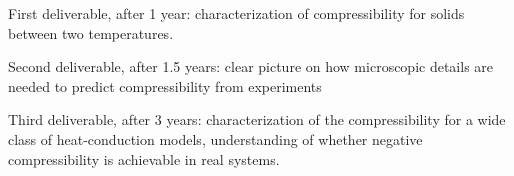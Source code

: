 \begin{workpackage}[id=WPcompress,wphases=0-36,
  short=Nonequilibrium compressibility, %
  title=Nonequilibrium compressibility, %
  lead=UNIPD,
  UNIPDRM=36]
\begin{wpdelivs}
  \begin{wpdeliv}[due=12,id=mydeliv1,dissem=PU,nature=DEM,lead=UNIPD]
      {First deliverable, after 1 year: characterization of compressibility for solids between two temperatures.}
  \end{wpdeliv}
  \begin{wpdeliv}[due=18,id=mydeliv2,dissem=PU,nature=DEM,lead=UNIPD]
      {Second deliverable, after 1.5 years: clear picture on how microscopic details are needed to predict compressibility from experiments}
\end{wpdeliv}
  \begin{wpdeliv}[due=36,id=mydeliv3,dissem=PU,nature=DEM,lead=UNIPD]
      {Third deliverable, after 3 years: characterization of the compressibility for a wide class of heat-conduction models, understanding of whether negative compressibility is achievable in real systems.}
\end{wpdeliv}
\end{wpdelivs}




\end{workpackage}
